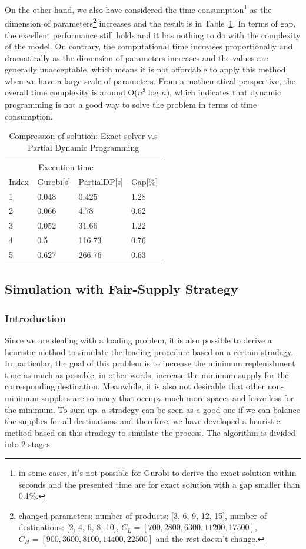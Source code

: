 \documentclass{article}
\begin{document}
On the other hand, we also have considered the time consumption\footnote{in some cases, it's not possible for Gurobi to derive the exact solution within seconds and the presented time are for exact solution with a gap smaller than 0.1\%.} as the dimension of parameters\footnote{changed parameters: number of products: [3, 6, 9, 12, 15], number of destinations: [2, 4, 6, 8, 10], $C_L=[700, 2800, 6300, 11200, 17500]$, $C_H=[900, 3600, 8100, 14400, 22500]$ and the rest doesn't change.} increases and the result is in Table~\ref{tab:exact_heu1}. In terms of gap, the excellent performance still holds and it has nothing to do with the complexity of the model. On contrary, the computational time increases proportionally and dramatically as the dimension of parameters increases and the values are generally unacceptable, which means it is not affordable to apply this method when we have a large scale of parameters. From a mathematical perspective, the overall time complexity is around O($n^3\log_{}n$), which indicates that dynamic programming is not a good way to solve the problem in terms of time consumption.

\begin{table}[ht]
 \caption{Compression of solution: Exact solver v.s Partial Dynamic Programming}
  \centering
  \begin{tabular}{llll}
    \toprule
    \multicolumn{3}{c}{Execution time}                   \\
    \cmidrule(r){2-3}
    Index   & Gurobi[s]     & PartialDP[s]      & Gap[\%] \\
    \midrule
    1	&	0.048	&	0.425	&	1.28	\\
    2	&	0.066	&	4.78	&	0.62	\\
    3	&	0.052	&	31.66	&	1.22	\\
    4	&	0.5	&	116.73	&	0.76	\\
    5	&	0.627	&	266.76	&	0.63	\\
    \bottomrule
  \end{tabular}
  \label{tab:exact_heu1}
\end{table}

\subsection{Simulation with Fair-Supply Strategy}

\subsubsection{Introduction}
Since we are dealing with a loading problem, it is also possible to derive a heuristic method to simulate the loading procedure based on a certain stradegy. In particular, the goal of this problem is to increase the minimum replenishment time as much as possible, in other words, increase the minimum supply for the corresponding destination. Meanwhile, it is also not desirable that other non-minimum supplies are so many that occupy much more spaces and leave less for the minimum. To sum up. a stradegy can be seen as a good one if we can balance the supplies for all destinations and therefore, we have developed a heuristic method based on this stradegy to simulate the process. The algorithm is divided into 2 stages:
\end{document}
